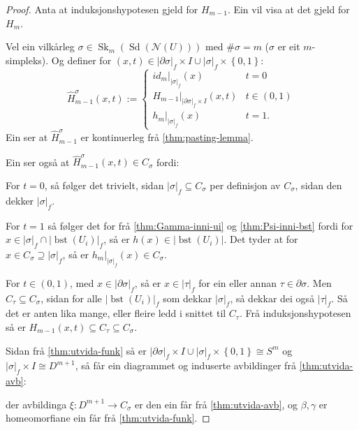 \documentclass[a4paper, 12pt, norsk]{article}
\theoremstyle{plain}
\theoremstyle{definition}
\newcommand{\Nc}{\mathcal{N}}
\newcommand{\intersect}{ \mathop{\cap}\limits }
\newcommand{\union}{ \mathop{\cup}\limits }
\newcommand{\gr}[1]{ \lvert #1 \rvert } %
\newcommand{\set}[1]{ \left\{ #1 \right\} } %
\DeclareMathOperator{\Sd}{Sd} %
\DeclareMathOperator{\bst}{bst} %
\DeclareMathOperator{\Sk}{Sk} %
\begin{document}
\begin{proof}
	Anta at induksjonshypotesen gjeld for \( H_{m-1} \). Ein vil visa at det gjeld for \( H_m \).

	Vel ein vilkårleg \( \sigma \in \Sk_m(\Sd(\Nc(U))) \) med \( \#\sigma = m \) (\( \sigma \) er eit \( m \)-simpleks). Og definer for \( (x, t) \in \gr{\partial\sigma}_f \times I \union \gr{\sigma}_f \times \set{0, 1} \):
	\[
		\hat{H}_{m-1}^\sigma (x,t) := 
		\begin{cases}
			id_m|_{\gr{\sigma}_f}(x) & t=0 \\
			H_{m-1}|_{\gr{\partial\sigma}_f \times I}(x,t) & t \in (0, 1) \\
			h_m|_{\gr{\sigma}_f}(x) & t=1.
		\end{cases}
	\]
	Ein ser at \( \hat{H}_{m-1}^\sigma \) er kontinuerleg frå \autoref{thm:pasting-lemma}.
	
	Ein ser også at \( \hat{H}_{m-1}^\sigma (x,t) \in C_\sigma \) fordi: 
	
	For \( t = 0 \), så følger det trivielt, sidan \( \gr{\sigma}_f \subseteq C_\sigma \) per definisjon av \( C_\sigma \), sidan den dekker \( \gr{\sigma}_f \).
	
	For \( t = 1 \) så følger det for frå \autoref{thm:Gamma-inni-ui} og \autoref{thm:Psi-inni-bst} fordi for \( x \in \gr{\sigma}_f \intersect \gr{\bst(U_i)}_f \), så er \( h(x) \in \gr{\bst(U_i)} \). Det tyder at for \( x \in C_\sigma \supseteq \gr{\sigma}_f \), så er \( h_m|_{\gr{\sigma}_f}(x) \in C_\sigma \). 
	
	For \( t \in (0, 1) \), med \( x \in \gr{\partial\sigma}_f \), så er \( x \in \gr{\tau}_f \) for ein eller annan \( \tau \in \partial\sigma \). Men \( C_\tau \subseteq C_\sigma \), sidan for alle \( \gr{\bst(U_i)}_f \) som dekkar \( \gr{\sigma}_f \), så dekkar dei også \( \gr{\tau}_f \). Så det er anten lika mange, eller fleire ledd i snittet til \( C_\tau \). Frå induksjonshypotesen så er \( H_{m-1}(x, t) \subseteq C_{\tau} \subseteq C_\sigma \).

	Sidan frå \autoref{thm:utvida-funk} så er \( \gr{\partial\sigma}_f \times I \union \gr{\sigma}_f \times \set{0, 1} \cong S^{m} \) og \( \gr{\sigma}_f \times I \cong D^{m+1} \), så får ein diagrammet og induserte avbildinger frå \autoref{thm:utvida-avb}:

	\begin{center}
	\end{center}
	der avbildinga \( \xi: D^{m+1} \to C_\sigma \) er den ein får frå \autoref{thm:utvida-avb}, og \( \beta, \gamma \) er homeomorfiane ein får frå \autoref{thm:utvida-funk}.


\end{proof}
\end{document}
